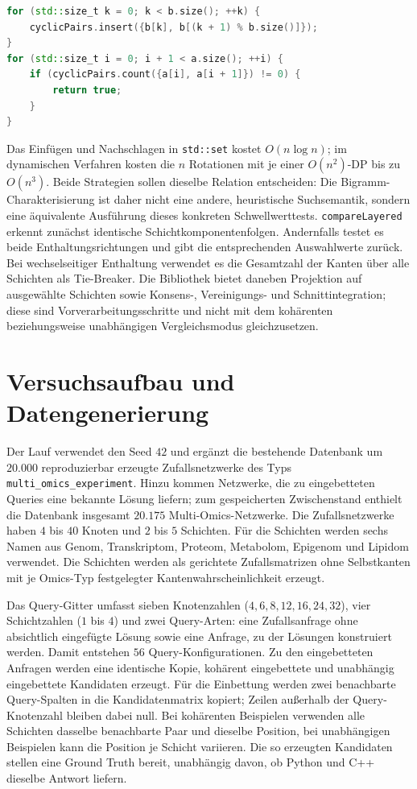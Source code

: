 \documentclass[a4paper,12pt, twoside]{report}
\theoremstyle{definition}
\begin{document}
\begin{lstlisting}[language=C++, caption={Bigramm-Prüfung auf ein zyklisch benachbartes Paar}]
for (std::size_t k = 0; k < b.size(); ++k) {
    cyclicPairs.insert({b[k], b[(k + 1) % b.size()]});
}
for (std::size_t i = 0; i + 1 < a.size(); ++i) {
    if (cyclicPairs.count({a[i], a[i + 1]}) != 0) {
        return true;
    }
}
\end{lstlisting}

Das Einfügen und Nachschlagen in \texttt{std::set} kostet $O(n\log n)$; im dynamischen Verfahren kosten die $n$ Rotationen mit je einer $O(n^2)$-DP bis zu $O(n^3)$. Beide Strategien sollen dieselbe Relation entscheiden: Die Bigramm-Charakterisierung ist daher nicht eine andere, heuristische Suchsemantik, sondern eine äquivalente Ausführung dieses konkreten Schwellwerttests. \texttt{compareLayered} erkennt zunächst identische Schichtkomponentenfolgen. Andernfalls testet es beide Enthaltungsrichtungen und gibt die entsprechenden Auswahlwerte zurück. Bei wechselseitiger Enthaltung verwendet es die Gesamtzahl der Kanten über alle Schichten als Tie-Breaker. Die Bibliothek bietet daneben Projektion auf ausgewählte Schichten sowie Konsens-, Vereinigungs- und Schnittintegration; diese sind Vorverarbeitungsschritte und nicht mit dem kohärenten beziehungsweise unabhängigen Vergleichsmodus gleichzusetzen.

\section{Versuchsaufbau und Datengenerierung}
\label{sec:multiomics_setup}

Der Lauf verwendet den Seed $42$ und ergänzt die bestehende Datenbank um $20.000$ reproduzierbar erzeugte Zufallsnetzwerke des Typs \texttt{multi\_omics\_experiment}. Hinzu kommen Netzwerke, die zu eingebetteten Queries eine bekannte Lösung liefern; zum gespeicherten Zwischenstand enthielt die Datenbank insgesamt $20.175$ Multi-Omics-Netzwerke. Die Zufallsnetzwerke haben $4$ bis $40$ Knoten und $2$ bis $5$ Schichten. Für die Schichten werden sechs Namen aus Genom, Transkriptom, Proteom, Metabolom, Epigenom und Lipidom verwendet. Die Schichten werden als gerichtete Zufallsmatrizen ohne Selbstkanten mit je Omics-Typ festgelegter Kantenwahrscheinlichkeit erzeugt.

Das Query-Gitter umfasst sieben Knotenzahlen ($4,6,8,12,16,24,32$), vier Schichtzahlen ($1$ bis $4$) und zwei Query-Arten: eine Zufallsanfrage ohne absichtlich eingefügte Lösung sowie eine Anfrage, zu der Lösungen konstruiert werden. Damit entstehen $56$ Query-Konfigurationen. Zu den eingebetteten Anfragen werden eine identische Kopie, kohärent eingebettete und unabhängig eingebettete Kandidaten erzeugt. Für die Einbettung werden zwei benachbarte Query-Spalten in die Kandidatenmatrix kopiert; Zeilen außerhalb der Query-Knotenzahl bleiben dabei null. Bei kohärenten Beispielen verwenden alle Schichten dasselbe benachbarte Paar und dieselbe Position, bei unabhängigen Beispielen kann die Position je Schicht variieren. Die so erzeugten Kandidaten stellen eine Ground Truth bereit, unabhängig davon, ob Python und C++ dieselbe Antwort liefern.
\end{document}
